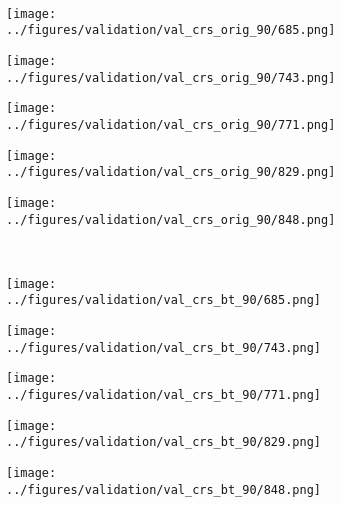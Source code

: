 \begin{figure}[h!]
\begin{subfigure}{0.19\textwidth}
		\label{fig:1}
	\end{subfigure}
	\vspace{-0.35cm}
	\\
	\begin{subfigure}{0.19\textwidth}
		\centering
		\texttt{[image: ../figures/validation/val\_crs\_orig\_90/685.png]}
		\label{fig:1}
	\end{subfigure}
	\begin{subfigure}{0.19\textwidth}
		\centering
		\texttt{[image: ../figures/validation/val\_crs\_orig\_90/743.png]}
		\label{fig:1}
	\end{subfigure}
	\begin{subfigure}{0.19\textwidth}
		\centering
		\texttt{[image: ../figures/validation/val\_crs\_orig\_90/771.png]}
		\label{fig:1}
	\end{subfigure}
	\begin{subfigure}{0.19\textwidth}
		\centering
		\texttt{[image: ../figures/validation/val\_crs\_orig\_90/829.png]}
		\label{fig:1}
	\end{subfigure}
	\begin{subfigure}{0.19\textwidth}
		\centering
		\texttt{[image: ../figures/validation/val\_crs\_orig\_90/848.png]}
		\label{fig:1}
	\end{subfigure}
		\vspace{-0.35cm}
	\\
	\begin{subfigure}{0.19\textwidth}
		\centering
		\texttt{[image: ../figures/validation/val\_crs\_bt\_90/685.png]}
		\label{fig:1}
	\end{subfigure}
	\begin{subfigure}{0.19\textwidth}
		\centering
		\texttt{[image: ../figures/validation/val\_crs\_bt\_90/743.png]}
		\label{fig:1}
	\end{subfigure}
	\begin{subfigure}{0.19\textwidth}
		\centering
		\texttt{[image: ../figures/validation/val\_crs\_bt\_90/771.png]}
		\label{fig:1}
	\end{subfigure}
	\begin{subfigure}{0.19\textwidth}
		\centering
		\texttt{[image: ../figures/validation/val\_crs\_bt\_90/829.png]}
		\label{fig:1}
	\end{subfigure}
	\begin{subfigure}{0.19\textwidth}
		\centering
		\texttt{[image: ../figures/validation/val\_crs\_bt\_90/848.png]}

\end{subfigure}
\end{figure}
